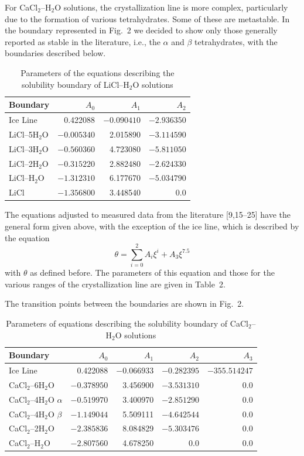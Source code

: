 \documentclass[11pt]{article}
\begin{document}
For CaCl$_2$--H$_2$O solutions, the crystallization line is more complex, particularly due
to the formation of various tetrahydrates. Some of these are metastable. In the boundary
represented in Fig.~2 we decided to show only those generally reported as stable in the
literature, i.e., the $\alpha$ and $\beta$ tetrahydrates, with the boundaries described
below.

\begin{table}[htbp]
\centering
\caption{Parameters of the equations describing the solubility boundary of LiCl--H$_2$O
solutions}
\begin{tabular}{lrrr}
\toprule
Boundary & $A_0$ & $A_1$ & $A_2$ \\
\midrule
Ice Line & 0.422088 & $-0.090410$ & $-2.936350$ \\
LiCl--5H$_2$O & $-0.005340$ & 2.015890 & $-3.114590$ \\
LiCl--3H$_2$O & $-0.560360$ & 4.723080 & $-5.811050$ \\
LiCl--2H$_2$O & $-0.315220$ & 2.882480 & $-2.624330$ \\
LiCl--H$_2$O & $-1.312310$ & 6.177670 & $-5.034790$ \\
LiCl & $-1.356800$ & 3.448540 & 0.0 \\
\bottomrule
\end{tabular}
\end{table}

The equations adjusted to measured data from the literature [9,15--25] have the general
form given above, with the exception of the ice line, which is described by the equation
\begin{equation}
\theta = \sum_{i=0}^{2} A_i \xi^i + A_3 \xi^{7.5}
\end{equation}
with $\theta$ as defined before. The parameters of this equation and those for the various
ranges of the crystallization line are given in Table~2.

The transition points between the boundaries are shown in Fig.~2.

\begin{table}[htbp]
\centering
\caption{Parameters of equations describing the solubility boundary of CaCl$_2$--H$_2$O
solutions}
\begin{tabular}{lrrrr}
\toprule
Boundary & $A_0$ & $A_1$ & $A_2$ & $A_3$ \\
\midrule
Ice Line & 0.422088 & $-0.066933$ & $-0.282395$ & $-355.514247$ \\
CaCl$_2$--6H$_2$O & $-0.378950$ & 3.456900 & $-3.531310$ & 0.0 \\
CaCl$_2$--4H$_2$O $\alpha$ & $-0.519970$ & 3.400970 & $-2.851290$ & 0.0 \\
CaCl$_2$--4H$_2$O $\beta$ & $-1.149044$ & 5.509111 & $-4.642544$ & 0.0 \\
CaCl$_2$--2H$_2$O & $-2.385836$ & 8.084829 & $-5.303476$ & 0.0 \\
CaCl$_2$--H$_2$O & $-2.807560$ & 4.678250 & 0.0 & 0.0 \\
\bottomrule
\end{tabular}
\end{table}
\end{document}
